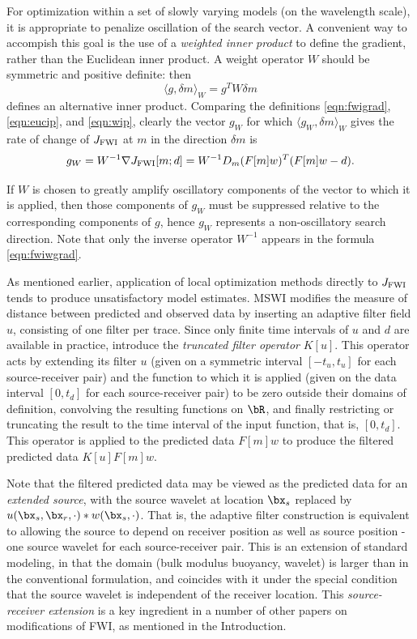 For optimization within a set of slowly varying models (on the
wavelength scale),  it is appropriate to penalize oscillation of the
search vector. A convenient way to accompish this goal is the use of a
{\em weighted inner product} to define the gradient, rather than the
Euclidean inner product. A weight operator $W$ should be symmetric and
positive definite: then
\begin{equation}
  \label{eqn:wip}
  \langle g, \delta m\rangle_W = g^TW\delta m
\end{equation}
defines an alternative inner product. Comparing the definitions
\ref{eqn:fwigrad}, \ref{eqn:eucip}, and \ref{eqn:wip}, clearly the
vector $g_W$ for which $\langle g_W, \delta m \rangle_W$ gives the
rate of change of $J_{\rm FWI}$ at $m$ in the direction $\delta m$ is
\begin{equation}
  \label{eqn:fwiwgrad}
  g_W = W^{-1}\nabla  J_{\rm FWI}[m;d] =W^{-1} D_m(F[m]w)^T(F[m]w-d).
\end{equation}

If $W$ is chosen to greatly
amplify oscillatory components of the vector to which it is applied,
then those components of $g_W$ must be suppressed relative to the
corresponding components of $g$, hence $g_W$ represents a
non-oscillatory search direction. Note that only the inverse operator
$W^{-1}$ appears in the formula \ref{eqn:fwiwgrad}.

As mentioned earlier, application of local optimization methods
directly to $J_{\rm FWI}$ tends to produce unsatisfactory model
estimates. MSWI modifies the measure of distance between predicted and
observed data by inserting an adaptive filter field $u$, consisting of
one filter per trace. Since only finite time intervals of $u$ and $d$ are available in
practice, introduce the {\em truncated filter operator} $K[u]$. This
operator acts by extending its filter $u$ (given on a symmetric
interval $[-t_u,t_u]$ for each source-receiver pair) and the function to which
it is applied (given on the data interval $[0,t_d]$ for each
source-receiver pair) to be zero outside their domains of definition, convolving the
resulting functions on $\bR$, and finally restricting or truncating
the result to the time interval of the input function, that is,
$[0,t_d]$. This operator is applied to the predicted data $F[m]w$ to
produce the filtered predicted data $K[u]F[m]w$.

Note that the filtered predicted data may be viewed as the predicted
data for an {\em extended source}, with the source wavelet at location
$\bx_s$ replaced by $u(\bx_s,\bx_r,\cdot) * w(\bx_s,\cdot)$. That is,
the adaptive filter construction is equivalent to allowing the source
to depend on receiver position as well as source position - one source
wavelet for each source-receiver pair. This is an extension of
standard modeling, in that the domain (bulk modulus buoyancy, wavelet)
is larger than in the conventional formulation, and coincides with it
under the special condition that the source wavelet is independent of
the receiver location. This  {\em
  source-receiver extension} \cite[]{HuangSymes2015SEG} is a key ingredient in a number of
other papers on modifications of FWI, as mentioned in the Introduction.

